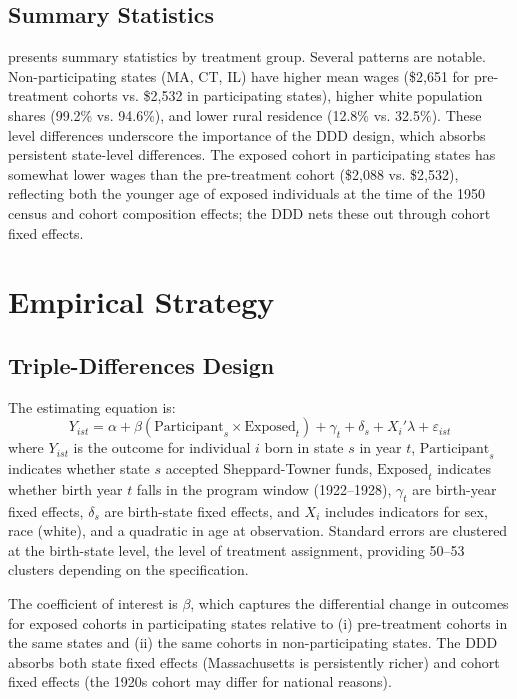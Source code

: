 \documentclass[12pt]{article}
\begin{document}
\subsection{Summary Statistics}



 presents summary statistics by treatment group. Several patterns are notable. Non-participating states (MA, CT, IL) have higher mean wages (\$2,651 for pre-treatment cohorts vs. \$2,532 in participating states), higher white population shares (99.2\% vs. 94.6\%), and lower rural residence (12.8\% vs. 32.5\%). These level differences underscore the importance of the DDD design, which absorbs persistent state-level differences. The exposed cohort in participating states has somewhat lower wages than the pre-treatment cohort (\$2,088 vs. \$2,532), reflecting both the younger age of exposed individuals at the time of the 1950 census and cohort composition effects; the DDD nets these out through cohort fixed effects.


\section{Empirical Strategy}

\subsection{Triple-Differences Design}

The estimating equation is:
\begin{equation}
Y_{ist} = \alpha + \beta (\text{Participant}_s \times \text{Exposed}_t) + \gamma_t + \delta_s + X_i'\lambda + \varepsilon_{ist} \label{eq:ddd}
\end{equation}
where $Y_{ist}$ is the outcome for individual $i$ born in state $s$ in year $t$, $\text{Participant}_s$ indicates whether state $s$ accepted Sheppard-Towner funds, $\text{Exposed}_t$ indicates whether birth year $t$ falls in the program window (1922--1928), $\gamma_t$ are birth-year fixed effects, $\delta_s$ are birth-state fixed effects, and $X_i$ includes indicators for sex, race (white), and a quadratic in age at observation. Standard errors are clustered at the birth-state level, the level of treatment assignment, providing 50--53 clusters depending on the specification.

The coefficient of interest is $\beta$, which captures the differential change in outcomes for exposed cohorts in participating states relative to (i) pre-treatment cohorts in the same states and (ii) the same cohorts in non-participating states. The DDD absorbs both state fixed effects (Massachusetts is persistently richer) and cohort fixed effects (the 1920s cohort may differ for national reasons).
\end{document}
